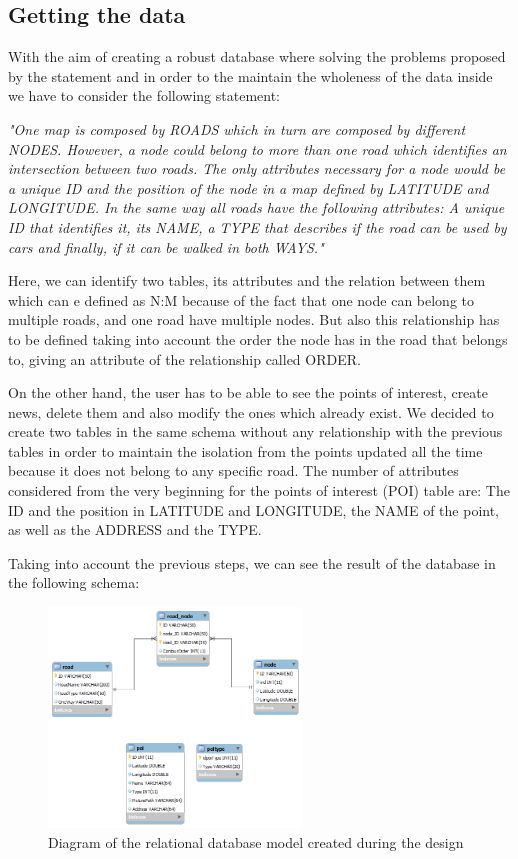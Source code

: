 \documentclass{article}
\begin{document}
\subsection{Getting the data}
With the aim of creating a robust database where solving the problems proposed by the statement and in order to the maintain the wholeness of the data inside we have to consider the following statement:

\textit{"One map is composed by ROADS which in turn are composed by different NODES. However, a node could belong to more than one road which identifies an intersection between two roads. The only attributes necessary for a node would be a unique ID and the position of the node in a map defined by LATITUDE and LONGITUDE. In the same way all roads have the following attributes: A unique ID that identifies it, its NAME, a TYPE that describes if the road can be used by cars and finally, if it can be walked in both WAYS."}

Here, we can identify two tables, its attributes and the relation between them which can e defined as N:M because of the fact that one node can belong to multiple roads, and one road have multiple nodes. But also this relationship has to be defined taking into account the order the node has in the road that belongs to, giving an attribute of the relationship called ORDER.

On the other hand, the user has to be able to see the points of interest, create news, delete them and also modify the ones which already exist. We decided to create two tables in the same schema without any relationship with the previous tables in order to maintain the isolation from the points updated all the time because it does not belong to any specific road.
The number of attributes considered from the very beginning for the points of interest (POI) table are: The ID and the position in LATITUDE and LONGITUDE, the NAME of the point, as well as the ADDRESS and the TYPE.

Taking into account the previous steps, we can see the result of the database in the following schema:

\begin{figure}[h]
\centering
\includegraphics[width=0.6\textwidth]{big_schneider.png}
\caption{Diagram of the relational database model created during the design}
\label{fig:RelDBdiagram}
\end{figure}
\end{document}
